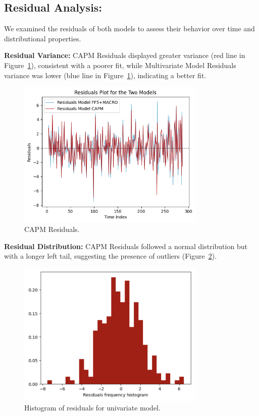 \subsection{Residual Analysis:}
We examined the residuals of both models to assess their behavior over time and distributional properties.

\textbf{Residual Variance:} CAPM Residuals displayed greater variance (red line in Figure~\ref{fig:7_5}), consistent with a
poorer fit, while Multivariate Model Residuals variance was lower (blue line in Figure~\ref{fig:7_5}), indicating a better fit.

\begin{figure}[h!]
    \centering
    \includegraphics[width=0.8\textwidth]{images/7_5.png}
    \caption{CAPM Residuals.}\label{fig:7_5}
\end{figure}

\textbf{Residual Distribution:} CAPM Residuals followed a normal distribution but with a longer left tail, suggesting the
presence of outliers (Figure~\ref{fig:7_6}).

\begin{figure}[h!]
    \centering
    \includegraphics[width=0.8\textwidth]{images/7_6.png}
    \caption{Histogram of residuals for univariate model.}\label{fig:7_6}
\end{figure}

